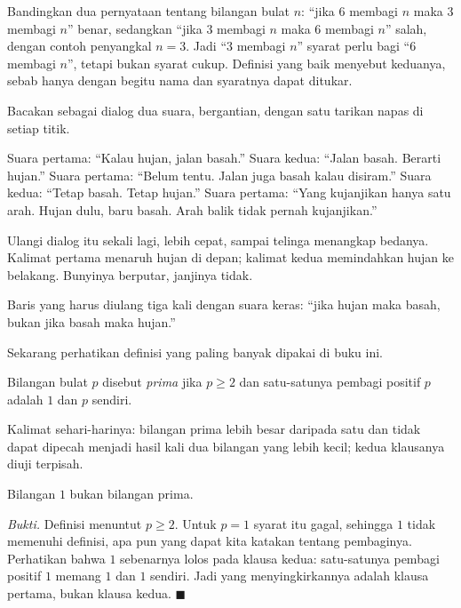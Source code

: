 
Bandingkan dua pernyataan tentang bilangan bulat $n$: ``jika $6$ membagi $n$ maka $3$
membagi $n$'' benar, sedangkan ``jika $3$ membagi $n$ maka $6$ membagi $n$'' salah,
dengan contoh penyangkal $n=3$. Jadi ``$3$ membagi $n$'' syarat perlu bagi ``$6$ membagi
$n$'', tetapi bukan syarat cukup. Definisi yang baik menyebut keduanya, sebab hanya
dengan begitu nama dan syaratnya dapat ditukar.

\begin{bacakeras}
Bacakan sebagai dialog dua suara, bergantian, dengan satu tarikan napas di setiap titik.

Suara pertama: ``Kalau hujan, jalan basah.''
Suara kedua: ``Jalan basah. Berarti hujan.''
Suara pertama: ``Belum tentu. Jalan juga basah kalau disiram.''
Suara kedua: ``Tetap basah. Tetap hujan.''
Suara pertama: ``Yang kujanjikan hanya satu arah. Hujan dulu, baru basah. Arah balik tidak pernah kujanjikan.''

Ulangi dialog itu sekali lagi, lebih cepat, sampai telinga menangkap bedanya. Kalimat
pertama menaruh hujan di depan; kalimat kedua memindahkan hujan ke belakang. Bunyinya
berputar, janjinya tidak.

Baris yang harus diulang tiga kali dengan suara keras: ``jika hujan maka basah, bukan jika
basah maka hujan.''
\end{bacakeras}

Sekarang perhatikan definisi yang paling banyak dipakai di buku ini.

\begin{definisi}
Bilangan bulat $p$ disebut \emph{prima} jika $p \geq 2$ dan satu-satunya pembagi
positif $p$ adalah $1$ dan $p$ sendiri.
\end{definisi}

Kalimat sehari-harinya: bilangan prima lebih besar daripada satu dan tidak dapat dipecah
menjadi hasil kali dua bilangan yang lebih kecil; kedua klausanya diuji terpisah.

\begin{proposisi}
Bilangan $1$ bukan bilangan prima.
\end{proposisi}
\par\smallskip\noindent\textit{Bukti.} Definisi menuntut $p \geq 2$. Untuk $p = 1$
syarat itu gagal, sehingga $1$ tidak memenuhi definisi, apa pun yang dapat kita
katakan tentang pembaginya. Perhatikan bahwa $1$ sebenarnya lolos pada klausa kedua:
satu-satunya pembagi positif $1$ memang $1$ dan $1$ sendiri. Jadi yang menyingkirkannya
adalah klausa pertama, bukan klausa kedua.
\hfill$\blacksquare${\parfillskip=0pt\par}


